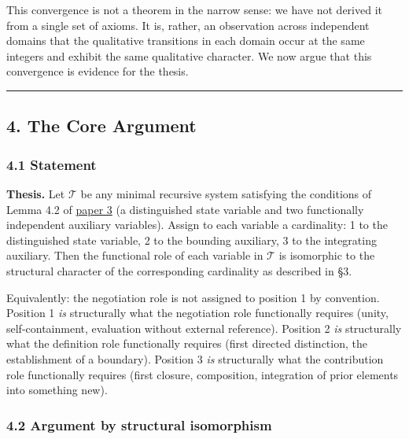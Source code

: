 \documentclass[
  11pt,
  letterpaper,
]{article}
\begin{document}
This convergence is not a theorem in the narrow sense: we have not
derived it from a single set of axioms. It is, rather, an observation
across independent domains that the qualitative transitions in each
domain occur at the same integers and exhibit the same qualitative
character. We now argue that this convergence is evidence for the
thesis.

\begin{center}\rule{0.5\linewidth}{0.5pt}\end{center}

\subsection{4. The Core Argument}\label{the-core-argument}

\subsubsection{4.1 Statement}\label{statement}

\textbf{Thesis.} Let \(\mathcal{T}\) be any minimal recursive system
satisfying the conditions of Lemma 4.2 of
\href{https://github.com/baardev/truevalue/blob/main/docnav/Research/papers/3_minimal-recursive-triadic-framework/3_minimal-recursive-triadic-framework.pdf}{paper
3} (a distinguished state variable and two functionally independent
auxiliary variables). Assign to each variable a cardinality: 1 to the
distinguished state variable, 2 to the bounding auxiliary, 3 to the
integrating auxiliary. Then the functional role of each variable in
\(\mathcal{T}\) is isomorphic to the structural character of the
corresponding cardinality as described in §3.

Equivalently: the negotiation role is not assigned to position 1 by
convention. Position 1 \emph{is} structurally what the negotiation role
functionally requires (unity, self-containment, evaluation without
external reference). Position 2 \emph{is} structurally what the
definition role functionally requires (first directed distinction, the
establishment of a boundary). Position 3 \emph{is} structurally what the
contribution role functionally requires (first closure, composition,
integration of prior elements into something new).

\subsubsection{4.2 Argument by structural
isomorphism}\label{argument-by-structural-isomorphism}
\end{document}
